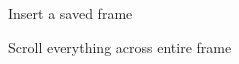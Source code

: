 \documentclass[12pt]{article} %
\begin{document}
\begin{figure}[H]
	\centering
	\caption{Insert a saved frame}
	\label{fig:UC13}
\end{figure}

\begin{figure}[H]
	\centering
	\caption{Scroll everything across entire frame}
	\label{fig:UC14}
\end{figure}

  
\end{document}
